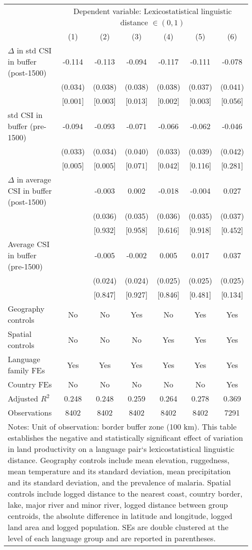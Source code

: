 
\begin{tabular}{lcccccc}
\toprule\toprule
& \multicolumn{6}{p{0.5\textwidth}}{\raggedleft Dependent variable: Lexicostatistical linguistic distance $\in(0,1)$} \tabularnewline
\cmidrule(lr){2-7}
 & (1)  & (2)  & (3)  & (4)  & (5)  & (6) \tabularnewline
    
\midrule$\Delta$ in std CSI in buffer (post-1500) & -0.114 & -0.113 & -0.094  & -0.117 & -0.111 & -0.078 \tabularnewline
& (0.034) & (0.038)  & (0.038) & (0.038) & (0.037) & (0.041) \tabularnewline
& [0.001] & [0.003]  & [0.013]  & [0.002]  & [0.003]  & [0.056]  \tabularnewline
    
std CSI in buffer (pre-1500) & -0.094 & -0.093 & -0.071  & -0.066 & -0.062 & -0.046  \tabularnewline
& (0.033) & (0.034)  & (0.040) & (0.033) & (0.039) & (0.042) \tabularnewline
& [0.005] & [0.005]  & [0.071]  & [0.042]  & [0.116]  & [0.281]  \tabularnewline

$\Delta$ in average CSI in buffer (post-1500) &  & -0.003 & 0.002  & -0.018 & -0.004 & 0.027  \tabularnewline
&  & (0.036)  & (0.035) & (0.036) & (0.035) & (0.037) \tabularnewline
&  & [0.932]  & [0.958]  & [0.616]  & [0.918]  & [0.452] \tabularnewline

Average CSI in buffer (pre-1500) &  & -0.005 & -0.002  & 0.005 & 0.017 & 0.037 \tabularnewline
&  & (0.024)  & (0.024) & (0.025) & (0.025) & (0.025) \tabularnewline
&  & [0.847]  & [0.927]  & [0.846]  & [0.481]  & [0.134]   \tabularnewline
    
\midrule
Geography controls & No & No & Yes & No & Yes & Yes \tabularnewline
Spatial controls & No & No & No & Yes & Yes & Yes \tabularnewline
Language family FEs & Yes & Yes & Yes & Yes & Yes & Yes \tabularnewline
Country FEs & No & No & No & No & No & Yes \tabularnewline
Adjusted $R^{2}$
 & 0.248 & 0.248 & 0.259 & 0.264 & 0.278 & 0.369  \tabularnewline
Observations & 8402 & 8402 & 8402 & 8402 & 8402 & 7291  \tabularnewline
    
\bottomrule
\multicolumn{7}{p{\textwidth}}{\scriptsize Notes: Unit of observation: border buffer zone (100 km). This table establishes the negative and statistically significant effect of variation in land productivity on a language pair`s lexicostatistical linguistic distance. Geography controls include mean elevation, ruggedness, mean temperature and its standard deviation, mean precipitation and its standard deviation, and the prevalence of malaria. Spatial controls include logged distance to the nearest coast, country border, lake, major river and minor river, logged distance between group centroids, the absolute difference in latitude and longitude, logged land area and logged population. SEs are double clustered at the level of each language group and are reported in parentheses.}
\end{tabular}%
